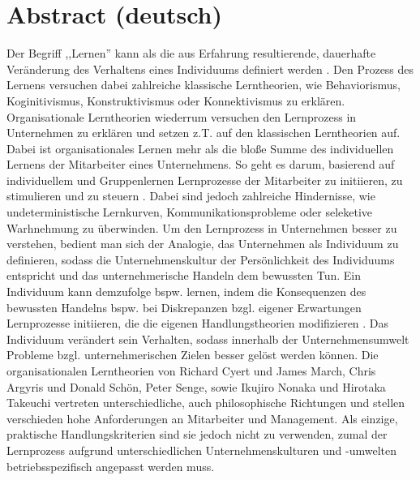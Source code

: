 \documentclass[12pt]{article}
\begin{document}
\maketitle

\section{Abstract (deutsch)}

Der Begriff ,,Lernen'' kann als die aus Erfahrung resultierende, dauerhafte
Veränderung des Verhaltens eines Individuums definiert werden
\cite{Lefrancois:2006}. Den Prozess des Lernens versuchen dabei zahlreiche
klassische Lerntheorien, wie Behaviorismus, Koginitivismus, Konstruktivismus
oder Konnektivismus zu erklären. Organisationale Lerntheorien wiederrum
versuchen den Lernprozess in Unternehmen zu erklären und setzen z.T. auf den
klassischen Lerntheorien auf. Dabei ist organisationales Lernen mehr als die
bloße Summe des individuellen Lernens der Mitarbeiter eines Unternehmens. So
geht es darum, basierend auf individuellem und Gruppenlernen Lernprozesse der
Mitarbeiter zu initiieren, zu stimulieren und zu steuern \cite{Franken:2002}.
Dabei sind jedoch zahlreiche Hindernisse, wie undeterministische Lernkurven,
Kommunikationsprobleme oder seleketive Warhnehmung zu überwinden. Um den
Lernprozess in Unternehmen besser zu verstehen, bedient man sich der Analogie,
das Unternehmen als Individuum zu definieren, sodass die Unternehmenskultur der
Persönlichkeit des Individuums entspricht und das unternehmerische Handeln dem
bewussten Tun. Ein Individuum kann demzufolge bspw. lernen, indem die
Konsequenzen des bewussten Handelns bspw. bei Diskrepanzen bzgl. eigener
Erwartungen Lernprozesse initiieren, die die eigenen Handlungstheorien
modifizieren \cite{Pawlowsky:1992}. Das Individuum verändert sein Verhalten,
sodass innerhalb der Unternehmensumwelt Probleme bzgl. unternehmerischen Zielen
besser gelöst werden können. Die organisationalen Lerntheorien von Richard
Cyert und James March, Chris Argyris und Donald Schön, Peter Senge, sowie
Ikujiro Nonaka und Hirotaka Takeuchi vertreten unterschiedliche, auch
philosophische Richtungen und stellen verschieden hohe Anforderungen an
Mitarbeiter und Management. Als einzige, praktische Handlungskriterien sind sie
jedoch nicht zu verwenden, zumal der Lernprozess aufgrund unterschiedlichen
Unternehmenskulturen und -umwelten betriebsspezifisch angepasst werden muss.
\end{document}
